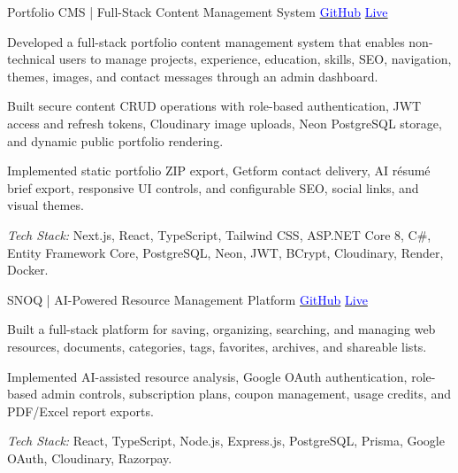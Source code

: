 
\begin{cventries}


\cventry
    {Portfolio CMS \textnormal{| Full-Stack Content Management System}}
  {{\href{https://github.com/hrithikksingh3/DevFolioGen-with-CMS}{\textcolor{blue}{GitHub}} \hspace{4pt} \href{https://hrithiksingh.onrender.com/}{\textcolor{blue}{Live}}}}
    {
      \begin{cvitems}
        \item {Developed a full-stack portfolio content management system that enables non-technical users to manage projects, experience, education, skills, SEO, navigation, themes, images, and contact messages through an admin dashboard.}
        \item {Built secure content CRUD operations with role-based authentication, JWT access and refresh tokens, Cloudinary image uploads, Neon PostgreSQL storage, and dynamic public portfolio rendering.}
        \item {Implemented static portfolio ZIP export, Getform contact delivery, AI résumé brief export, responsive UI controls, and configurable SEO, social links, and visual themes.}
        \item {\textit{Tech Stack:} Next.js, React, TypeScript, Tailwind CSS, ASP.NET Core 8, C\#, Entity Framework Core, PostgreSQL, Neon, JWT, BCrypt, Cloudinary, Render, Docker.}
      \end{cvitems}
    }

 \cventry
    {SNOQ \textnormal{| AI-Powered Resource Management Platform}}
    {{\href{https://github.com/hrithikksingh3/snoq}{\textcolor{blue}{GitHub}} \hspace{4pt} \href{https://snoq.onrender.com/}{\textcolor{blue}{Live}}}}
    {
      \begin{cvitems}
        \item {Built a full-stack platform for saving, organizing, searching, and managing web resources, documents, categories, tags, favorites, archives, and shareable lists.}
        \item {Implemented AI-assisted resource analysis, Google OAuth authentication, role-based admin controls, subscription plans, coupon management, usage credits, and PDF/Excel report exports.}
        \item {\textit{Tech Stack:} React, TypeScript, Node.js, Express.js, PostgreSQL, Prisma, Google OAuth, Cloudinary, Razorpay.}
      \end{cvitems}
    }


\end{cventries}
